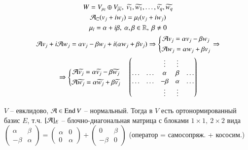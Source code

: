 \documentclass[main]{subfiles}
\begin{document}
\begin{gather*}
    W = V_{\mu_l} \oplus V_{\overline{\mu_l}}, \ \widetilde{v_1}, \widetilde{w_1}, \ldots, \widetilde{v_q}, \widetilde{w_q} \\
    \mathcal{A}_{\mathbb{C}}(v_j+ iw_j) = \mu_l (v_j+ iw_j) \\
    \mu_l = \alpha + i \beta, \ \alpha, \beta \in \mathbb{R}, \ \beta \neq 0 \\
    \mathcal{A} v_j + i \mathcal{A} w_j =\alpha v_j - \beta w_j + i(\alpha w_j + \beta v_j) \Rightarrow \left\{ \begin{gathered}
        \mathcal{A} v_j=\alpha v_j - \beta w_j \\
        \mathcal{A} w_j=\alpha w_j + \beta v_j
     \end{gathered} \right.
    \Rightarrow  \\ \Rightarrow \left\{ \begin{gathered}
       \mathcal{A} \widetilde{v_j}=\alpha \widetilde{v_j} - \beta \widetilde{w_j} \\
        \mathcal{A} \widetilde{w_j}=\alpha \widetilde{w_j} + \beta \widetilde{v_j}
    \end{gathered} \right. \quad
    \begin{pmatrix}
        & & \vdots & \vdots &  \\
        \ldots & \ldots & \alpha & \beta & \ldots \\
        \ldots & \ldots & -\beta & \alpha & \ldots \\
        & & \vdots & \vdots &  \\
    \end{pmatrix}
\end{gather*}

\begin{theorem} 
    $V$ -- евклидово, $\mathcal{A} \in \operatorname{End} V$ -- нормальный. Тогда в $V$ есть ортонормированный базис $E$, т.ч. $[\mathcal{A}]_E$ -- блочно-диагональная матрица с блоками $1\times 1, \ 2\times 2$ вида 
    $\begin{pmatrix}
        \alpha & \beta \\
        -\beta & \alpha
    \end{pmatrix} = \begin{pmatrix}
        \alpha & 0 \\
        0 & \alpha
    \end{pmatrix} + \begin{pmatrix}
        0 & \beta \\
        -\beta & 0
    \end{pmatrix}$ (оператор = самосопряж. + кососим.)
\end{theorem}
\end{document}
